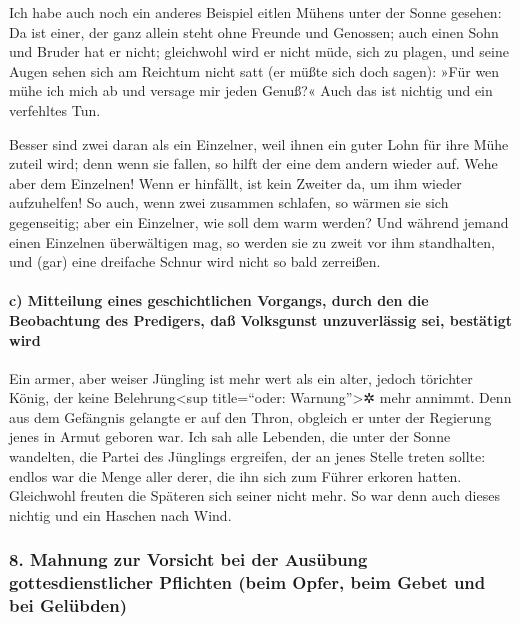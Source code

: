 Ich habe auch noch ein anderes Beispiel eitlen Mühens
unter der Sonne gesehen: Da ist einer, der ganz allein
steht ohne Freunde und Genossen; auch einen Sohn und Bruder hat er
nicht; gleichwohl wird er nicht müde, sich zu plagen, und seine Augen
sehen sich am Reichtum nicht satt (er müßte sich doch sagen): »Für wen
mühe ich mich ab und versage mir jeden Genuß?« Auch das ist nichtig und
ein verfehltes Tun.

Besser sind zwei daran als ein Einzelner, weil ihnen ein
guter Lohn für ihre Mühe zuteil wird; denn wenn sie
fallen, so hilft der eine dem andern wieder auf. Wehe aber dem
Einzelnen! Wenn er hinfällt, ist kein Zweiter da, um ihm wieder
aufzuhelfen! So auch, wenn zwei zusammen schlafen, so
wärmen sie sich gegenseitig; aber ein Einzelner, wie soll dem warm
werden? Und während jemand einen Einzelnen überwältigen
mag, so werden sie zu zweit vor ihm standhalten, und (gar) eine
dreifache Schnur wird nicht so bald zerreißen.

\hypertarget{c-mitteilung-eines-geschichtlichen-vorgangs-durch-den-die-beobachtung-des-predigers-dauxdf-volksgunst-unzuverluxe4ssig-sei-bestuxe4tigt-wird}{%
\paragraph{c) Mitteilung eines geschichtlichen Vorgangs, durch den die
Beobachtung des Predigers, daß Volksgunst unzuverlässig sei, bestätigt
wird}\label{c-mitteilung-eines-geschichtlichen-vorgangs-durch-den-die-beobachtung-des-predigers-dauxdf-volksgunst-unzuverluxe4ssig-sei-bestuxe4tigt-wird}}

Ein armer, aber weiser Jüngling ist mehr wert als ein
alter, jedoch törichter König, der keine Belehrung\textless sup
title=``oder: Warnung''\textgreater✲ mehr annimmt. Denn
aus dem Gefängnis gelangte er auf den Thron, obgleich er unter der
Regierung jenes in Armut geboren war. Ich sah alle
Lebenden, die unter der Sonne wandelten, die Partei des Jünglings
ergreifen, der an jenes Stelle treten sollte: endlos war
die Menge aller derer, die ihn sich zum Führer erkoren hatten.
Gleichwohl freuten die Späteren sich seiner nicht mehr. So war denn auch
dieses nichtig und ein Haschen nach Wind.

\hypertarget{mahnung-zur-vorsicht-bei-der-ausuxfcbung-gottesdienstlicher-pflichten-beim-opfer-beim-gebet-und-bei-geluxfcbden}{%
\subsubsection{8. Mahnung zur Vorsicht bei der Ausübung
gottesdienstlicher Pflichten (beim Opfer, beim Gebet und bei
Gelübden)}\label{mahnung-zur-vorsicht-bei-der-ausuxfcbung-gottesdienstlicher-pflichten-beim-opfer-beim-gebet-und-bei-geluxfcbden}}

